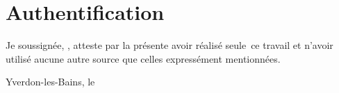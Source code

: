 
\chapter*{Authentification}

Je soussigné\ifx\thegenre\female e\fi, \theauthor, atteste par la présente avoir réalisé seul\ifx\thegenre\female e\fi~ce travail et n'avoir utilisé aucune autre source que celles expressément mentionnées.

\vfil
{\relax\theauthor\par
    \ifdefined\thesignature
        \printsignature

    \fi
}
\vfil
Yverdon-les-Bains, le \thedate